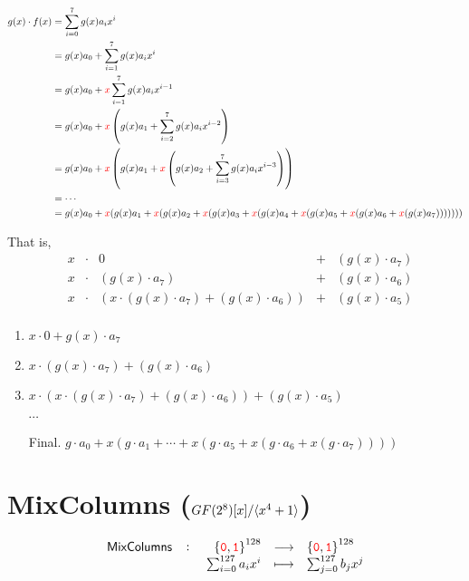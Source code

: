 

\begin{align*}
	g(x)\cdot f(x) &= \sum_{i=0}^7g(x)a_ix^i \\
	&= g(x)a_0 + \sum_{i=1}^7g(x)a_ix^i \\
	&= g(x)a_0 + \textcolor{red}{x}\sum_{i=1}^7g(x)a_ix^{i-1} \\
	&= g(x)a_0 + \textcolor{red}{x}\left(g(x)a_1 + \sum_{i=2}^7g(x)a_ix^{i-2}\right) \\
	&= g(x)a_0 + \textcolor{red}{x}\left(g(x)a_1 + \textcolor{red}{x}\left(g(x)a_2 + \sum_{i=3}^7g(x)a_ix^{i-3}\right)\right) \\
	&= \cdots \\
	&= g(x)a_0 + \textcolor{red}{x}(g(x)a_1 + \textcolor{red}{x}(g(x)a_2 + \textcolor{red}{x}(g(x)a_3 + \textcolor{red}{x}(g(x)a_4 + \textcolor{red}{x}(g(x)a_5 + \textcolor{red}{x}(g(x)a_6 + \textcolor{red}{x}(g(x)a_7)))))))
\end{align*}

That is, \begin{align*}
	&x &\cdot& 0 & + & (g(x)\cdot a_7)\\
	&x &\cdot& (g(x)\cdot a_7) & + & (g(x)\cdot a_6)\\
	&x &\cdot& (x\cdot (g(x)\cdot a_7) + (g(x)\cdot a_6)) & + & (g(x)\cdot a_5)\\
\end{align*}\begin{enumerate}[Step 1.]
	\item $x\cdot 0 + g(x)\cdot a_7$
	\item $x\cdot (g(x)\cdot a_7) + (g(x)\cdot a_6)$
	\item $x\cdot (x\cdot (g(x)\cdot a_7) + (g(x)\cdot a_6)) + (g(x)\cdot a_5)$
	\item[] $\cdots$
	\item[Final.] $g\cdot a_0 + x(g\cdot a_1 + \cdots + x(g\cdot a_5 + x(g\cdot a_6 + x(g\cdot a_7))))$
\end{enumerate}





\newpage

\section{MixColumns ($GF(2^8)[x]/\langle x^4+1 \rangle$)}
\[
\fullfunction{\textsf{MixColumns}}{\binaryfield^{128}}{\binaryfield^{128}}{\sum_{i=0}^{127}a_ix^i}{\sum_{j=0}^{127}b_jx^j}
\]

